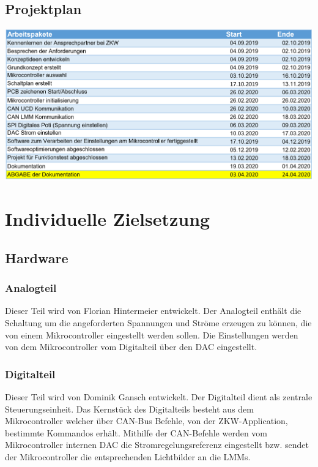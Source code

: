 \documentclass[paper=a4, 12pt]{scrreprt}
\begin{document}
	\section{Projektplan}\hfill \break
	\begin{adjustbox}{center,nofloat=figure,vspace=\bigskipamount}
		\includegraphics[width=\textwidth]{img/plan.PNG}
	\end{adjustbox}
	

\chapter{Individuelle Zielsetzung}\hfill \break
    \section{Hardware}    	\hfill \break
    	\subsection{Analogteil}\hfill \break
        Dieser Teil wird von Florian Hintermeier entwickelt. Der Analogteil enthält die Schaltung um die angeforderten Spannungen und Ströme erzeugen zu können, die von einem Mikrocontroller eingestellt werden sollen. Die Einstellungen werden von dem Mikrocontroller vom Digitalteil über den DAC eingestellt.
        
        \subsection{Digitalteil}\hfill \break
        Dieser Teil wird von Dominik Gansch entwickelt. Der Digitalteil dient als zentrale Steuerungseinheit. Das Kernstück des Digitalteils besteht aus dem Mikrocontroller welcher über CAN-Bus Befehle, von der ZKW-Application, bestimmte Kommandos erhält. Mithilfe der CAN-Befehle werden vom Mikrocontroller internen DAC die Stromregelungsreferenz eingestellt bzw. sendet der Mikrocontroller die entsprechenden Lichtbilder an die LMMs.%
\end{document}
